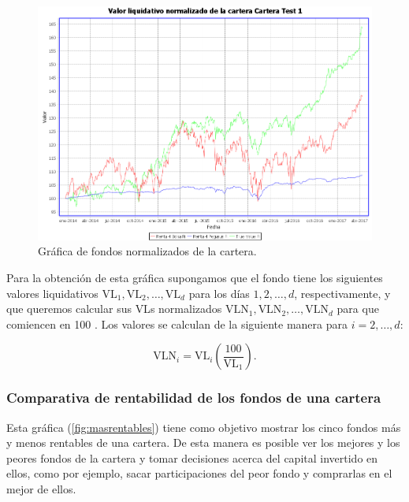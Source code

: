 \documentclass[12pt, a4paper]{book}
\begin{document}
	\begin{figure}[htbp]
	\centering
	\includegraphics[width=\textwidth]{figuras/normalizados.PNG}
	\caption{Gráfica de fondos normalizados de la cartera.}
	\label{fig:normalizados}
	\end {figure}
	
	


Para la obtención de esta gráfica supongamos que el fondo tiene los siguientes valores liquidativos $\text{VL}_1,\text{VL}_2,\ldots,\text{VL}_d$ para los días $1,2,\ldots,d$, respectivamente, y que queremos calcular sus \gls{VL}s normalizados $\text{VLN}_1,\text{VLN}_2,\ldots,\text{VLN}_d$ para que comiencen en 100 . Los valores se calculan de la siguiente manera para $i=2,\ldots,d$:

\begin{equation}
\text{VLN}_i=\text{VL}_i\left(\frac{100}{\text{VL}_1}\right).
\end{equation}

	\newpage

\subsubsection{Comparativa de rentabilidad de los fondos de una cartera}

Esta gráfica (\ref{fig:masrentables}) tiene como objetivo mostrar los cinco fondos más y menos rentables de una cartera. De esta manera es posible ver los mejores y los peores fondos de la cartera y tomar decisiones acerca del capital invertido en ellos, como por ejemplo, sacar participaciones del peor fondo y comprarlas en el mejor de ellos. \\
\end{document}
